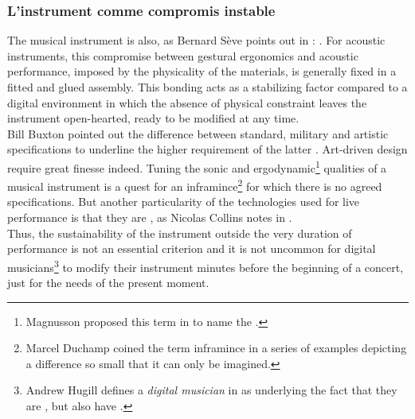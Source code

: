 \subsubsection{L'instrument comme compromis instable}

The musical instrument is also, as Bernard Sève points out in \cite{seve_instrument_2013}: . For acoustic instruments, this compromise between gestural ergonomics and acoustic performance, imposed by the physicality of the materials, is generally fixed in a fitted and glued assembly. This bonding acts as a stabilizing factor compared to a digital environment in which the absence of physical constraint leaves the instrument open-hearted, ready to be modified at any time.\\
\indent Bill Buxton pointed out the difference between standard, military and artistic specifications to underline the higher requirement of the latter \cite{buxton_artists_1997}. Art-driven design require great finesse indeed. Tuning the sonic and ergodynamic\footnote{Magnusson proposed this term in \cite{magnusson_ergodynamics_2019} to name the .} qualities of a musical instrument is a quest for an inframince\footnote{Marcel Duchamp \cite{duchamp_notes_2008} coined the term inframince in a series of examples depicting a difference so small that it can only be imagined.} for which there is no agreed specifications. But another particularity of the technologies used for live performance is that they are , as Nicolas Collins notes in \cite{collins_semiconducting_2013}.\\
\indent Thus, the sustainability of the instrument outside the very duration of performance is not an essential criterion and it is not uncommon for digital musicians\footnote{Andrew Hugill defines a \textit{digital musician} in \cite{hugill_digital_2019} as  underlying the fact that they are , but also have  .} to modify their instrument minutes before the beginning of a concert, just for the needs of the present moment.
	
